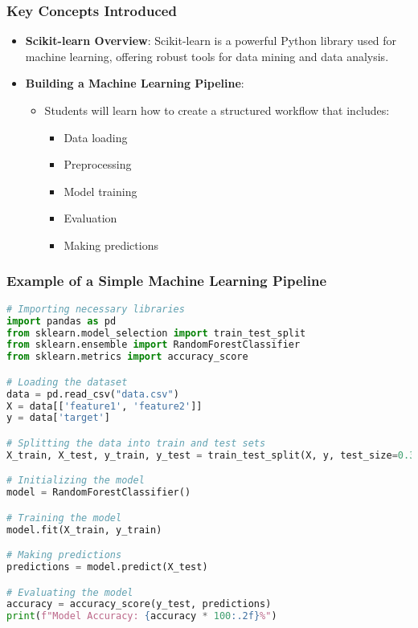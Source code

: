 \documentclass[aspectratio=169]{beamer}
\begin{document}
\begin{frame}[fragile]
    \frametitle{Key Concepts Introduced}
    \begin{itemize}
        \item \textbf{Scikit-learn Overview}: Scikit-learn is a powerful Python library used for machine learning, offering robust tools for data mining and data analysis.
        
        \item \textbf{Building a Machine Learning Pipeline}: 
        \begin{itemize}
            \item Students will learn how to create a structured workflow that includes:
            \begin{itemize}
                \item Data loading
                \item Preprocessing
                \item Model training
                \item Evaluation
                \item Making predictions
            \end{itemize}
        \end{itemize}
    \end{itemize}
\end{frame}

\begin{frame}[fragile]
    \frametitle{Example of a Simple Machine Learning Pipeline}
    \begin{lstlisting}[language=Python]
# Importing necessary libraries
import pandas as pd
from sklearn.model_selection import train_test_split
from sklearn.ensemble import RandomForestClassifier
from sklearn.metrics import accuracy_score

# Loading the dataset
data = pd.read_csv("data.csv")
X = data[['feature1', 'feature2']]
y = data['target']

# Splitting the data into train and test sets
X_train, X_test, y_train, y_test = train_test_split(X, y, test_size=0.3, random_state=42)

# Initializing the model
model = RandomForestClassifier()

# Training the model
model.fit(X_train, y_train)

# Making predictions
predictions = model.predict(X_test)

# Evaluating the model
accuracy = accuracy_score(y_test, predictions)
print(f"Model Accuracy: {accuracy * 100:.2f}%")
    \end{lstlisting}
\end{frame}
\end{document}
